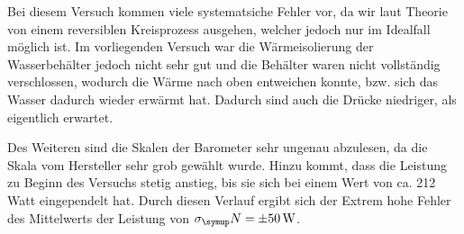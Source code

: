 Bei diesem Versuch kommen viele systematsiche Fehler vor, da wir laut Theorie
von einem reversiblen Kreisprozess ausgehen, welcher jedoch nur im Idealfall
möglich ist. Im vorliegenden Versuch war die Wärmeisolierung der Wasserbehälter
jedoch nicht sehr gut und die Behälter waren nicht vollständig verschlossen, wodurch
die Wärme nach oben entweichen konnte, bzw. sich das Wasser dadurch wieder erwärmt hat.
Dadurch sind auch die Drücke niedriger, als eigentlich erwartet.

\noindent Des Weiteren sind die Skalen der Barometer sehr ungenau abzulesen, da die Skala vom Hersteller
sehr grob gewählt wurde. Hinzu kommt, dass die Leistung zu Beginn des Versuchs stetig anstieg,
bis sie sich bei einem Wert von ca. 212 Watt eingependelt hat. Durch diesen Verlauf
ergibt sich der Extrem hohe Fehler des Mittelwerts der Leistung von $\sigma_\su{N}
=\pm 50 \,\si{\watt}$.
